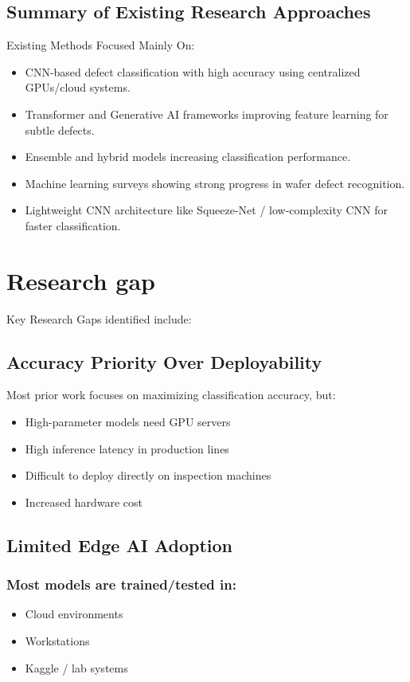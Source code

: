  \subsection{Summary of Existing Research Approaches}
 Existing Methods Focused Mainly On:
 \begin{itemize}
 \item CNN-based defect classification with high accuracy using centralized GPUs/cloud systems.
 \item Transformer and Generative AI frameworks improving feature learning for subtle defects.
 \item Ensemble and hybrid models increasing classification performance.
 \item Machine learning surveys showing strong progress in wafer defect recognition.
 \item Lightweight CNN architecture like Squeeze-Net / low-complexity CNN for faster classification.
 \end{itemize}

\section{Research gap}
Key Research Gaps identified include:
\subsection{Accuracy Priority Over Deployability}

Most prior work focuses on maximizing classification accuracy, but:
\begin{itemize}
     \item High-parameter models need GPU servers
     \item High inference latency in production lines
     \item Difficult to deploy directly on inspection machines
     \item Increased hardware cost
 \end{itemize}

 \subsection{Limited Edge AI Adoption}
 \subsubsection{Most models are trained/tested in:}
 \begin{itemize}
     \item Cloud environments
     \item Workstations
     \item Kaggle / lab systems
\end{itemize}

